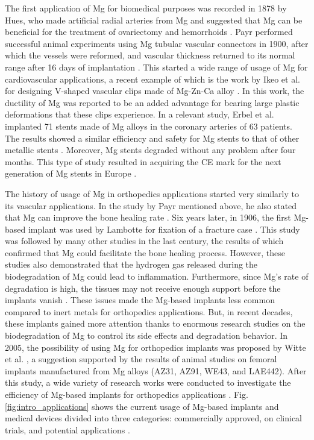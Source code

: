 The first application of Mg for biomedical purposes was recorded in 1878 by Hues, who made artificial radial arteries from Mg and suggested that Mg can be beneficial for the treatment of ovariectomy and hemorrhoids \cite{Gao2022}. Payr performed successful animal experiments using Mg tubular vascular connectors in 1900, after which the vessels were reformed, and vascular thickness returned to its normal range after 16 days of implantation \cite{Witte2010}. This started a wide range of usage of Mg for cardiovascular applications, a recent example of which is the work by Ikeo et al. for designing V-shaped vascular clips made of Mg-Zn-Ca alloy \cite{Ikeo2016}. In this work, the ductility of Mg was reported to be an added advantage for bearing large plastic deformations that these clips experience. In a relevant study, Erbel et al. implanted 71 stents made of Mg alloys in the coronary arteries of 63 patients. The results showed a similar efficiency and safety for Mg stents to that of other metallic stents \cite{Erbel2007}. Moreover, Mg stents degraded without any problem after four months. This type of study resulted in acquiring the CE mark for the next generation of Mg stents in Europe \cite{Sotomi2017,GarciaGarcia2018}.

The history of usage of Mg in orthopedics applications started very similarly to its vascular applications. In the study by Payr mentioned above, he also stated that Mg can improve the bone healing rate \cite{Witte2010}. Six years later, in 1906, the first Mg-based implant was used by Lambotte for fixation of a fracture case \cite{lambotte1909technique,lambotte1932utilisation}. This study was followed by many other studies in the last century, the results of which confirmed that Mg could facilitate the bone healing process. However, these studies also demonstrated that the hydrogen gas released during the biodegradation of Mg could lead to inflammation. Furthermore, since Mg's rate of degradation is high, the tissues may not receive enough support before the implants vanish \cite{Witte2010}. These issues made the Mg-based implants less common compared to inert metals for orthopedics applications. But, in recent decades, these implants gained more attention thanks to enormous research studies on the biodegradation of Mg to control its side effects and degradation behavior. In 2005, the possibility of using Mg for orthopedics implants was proposed by Witte et al. \cite{Witte2005}, a suggestion supported by the results of animal studies on femoral implants manufactured from Mg alloys (AZ31, AZ91, WE43, and LAE442). After this study, a wide variety of research works were conducted to investigate the efficiency of Mg-based implants for orthopedics applications \cite{Wang2020,Huang2020,Zhao2017}. Fig. \ref{fig:intro_applications} shows the current usage of Mg-based implants and medical devices divided into three categories: commercially approved, on clinical trials, and potential applications \cite{Han2019}.

